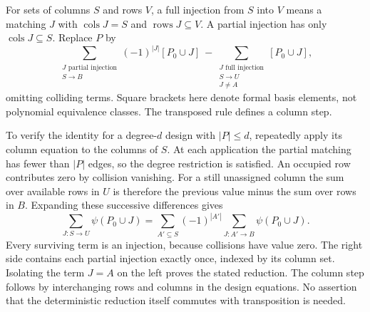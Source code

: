For sets of columns $S$ and rows $V$, a full injection from $S$ into $V$
means a matching $J$ with $\operatorname{cols}J=S$ and
$\operatorname{rows}J\subseteq V$.  A partial injection has only
$\operatorname{cols}J\subseteq S$.  Replace $P$ by
\[
 \sum_{\substack{J\text{ partial injection}\\S\to B}}
       (-1)^{|J|}[P_0\cup J]
 \ -\!
 \sum_{\substack{J\text{ full injection}\\S\to U\\J\ne A}}
       [P_0\cup J],
\]
omitting colliding terms.  Square brackets here denote formal basis
elements, not polynomial equivalence classes.  The transposed rule defines
a column step.

To verify the identity for a degree-$d$ design with $|P|\leq d$, repeatedly
apply its column equation to the columns of $S$.  At each application
the partial matching has fewer than $|P|$ edges, so the degree restriction
is satisfied.  An occupied row contributes zero by collision vanishing.
For a still unassigned column the sum over available rows in $U$ is
therefore the previous value minus the sum over rows in $B$.  Expanding
these successive differences gives
\[
 \sum_{J:S\to U}\psi(P_0\cup J)
  =\sum_{A'\subseteq S}(-1)^{|A'|}
       \sum_{J:A'\to B}\psi(P_0\cup J).
\]
Every surviving term is an injection, because collisions have value zero.
The right side contains each partial injection exactly once, indexed by
its column set.  Isolating the term $J=A$ on the left proves the stated
reduction.  The column step follows by interchanging rows and columns in
the design equations.  No assertion that the deterministic reduction
itself commutes with transposition is needed.

